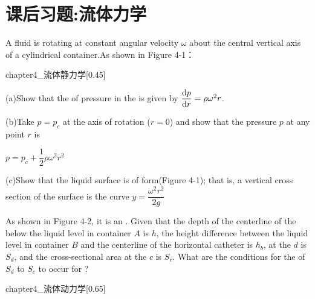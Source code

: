 \section{课后习题:流体力学}
	\begin{example}
		A fluid is rotating at constant angular velocity $\omega$ about the central vertical axis of a cylindrical container.As shown in Figure 4-1：
		\begin{singlefigure}[流体静力学]{chapter4_流体静力学}[0.45]
		\end{singlefigure}
		
		(a)Show that the  of pressure in the  is given by $\dfrac{\dif p}{\dif r}=\rho \omega^2 r$.
		
		(b)Take $p=p_c$ at the axis of rotation ($r=0$) and show that the pressure $p$ at any point $r$ is
		\begin{center}
			$p=p_c+\dfrac{1}{2}\rho\omega^2 r^2$
		\end{center}

		(c)Show that the liquid surface is of  form(Figure 4-1); that is, a vertical cross section of the surface is the curve $y=\dfrac{\omega^2 r^2}{2g}$
	\end{example}
	\begin{example}
		As shown in Figure 4-2, it is an . Given that the depth of the centerline of the  below the liquid level in container $A$ is $h$, 
		the height difference between the liquid level in container $B$ and the centerline of the horizontal catheter is $h_b$,  at the  $d$ is $S_d$, 
		and the cross-sectional area at the  $c$ is $S_c$. What are the conditions for the  of $S_d$ to $S_c$ to occur for ?
		\begin{singlefigure}[流体动力学]{chapter4_流体动力学}[0.65]
		\end{singlefigure}
	\end{example}
